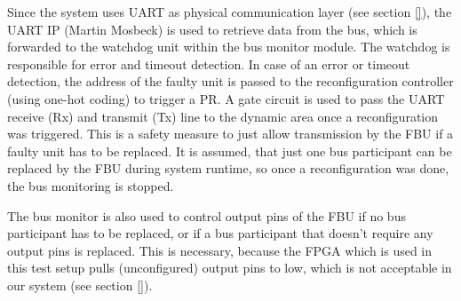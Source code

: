 Since the system uses UART as physical communication layer (see section \ref{}), the UART IP (Martin Mosbeck) is used to retrieve data from the bus, which is forwarded to the watchdog unit within the bus monitor module. The watchdog is responsible for error and timeout detection. 
In case of an error or timeout detection, the address of the faulty unit is passed to the reconfiguration controller (using one-hot coding) to trigger a \gls{PR}. 
A gate circuit is used to pass the \gls{UART} receive (Rx) and transmit (Tx) line to the dynamic area once a reconfiguration was triggered. This is a safety measure to just allow transmission by the \gls{FBU} if a faulty unit has to be replaced. 
It is assumed, that just one bus participant can be replaced by the \gls{FBU} during system runtime, so once a reconfiguration was done, the bus monitoring is stopped.

The bus monitor is also used to control output pins of the \gls{FBU} if no bus participant has to be replaced, or if a bus participant that doesn't require any output pins is replaced. 
This is necessary, because the \gls{FPGA} which is used in this test setup pulls (unconfigured) output pins to low, which is not acceptable in our system (see section \ref{}).
